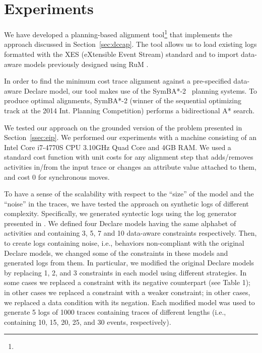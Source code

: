 \section{Experiments}
\label{sec:experiments}



We have developed a planning-based alignment tool\footnote{} that implements the approach discussed in Section~\ref{sec:dccap}.
%
The tool allows us to load existing logs formatted with the XES (eXtensible Event Stream) standard and to import data-aware models previously designed using RuM \cite{}.
%
%

In order to find the minimum cost trace alignment against a pre-specified data-aware Declare model, our tool makes use of the SymBA*-2~\cite{torralba2014symba} planning systems. To produce optimal alignments, SymBA*-2 (winner of the sequential optimizing track at the 2014 Int. Planning Competition) performs a bidirectional A* search.


We tested our approach on the grounded version of the problem presented in Section~\ref{ssec:eip}. We performed our experiments with a machine consisting of an Intel Core i7-4770S CPU 3.10GHz Quad Core and 4GB RAM. We used a standard cost function with unit costs for any alignment step that adds/removes activities in/from the input trace or changes an attribute value attached to them, and cost 0 for synchronous moves.

%
To have a sense of the scalability with respect to the ``size'' of the model and the ``noise'' in the traces, we have tested the approach on synthetic logs of different complexity.
%
Specifically, we generated syntectic logs using the log generator presented in \cite{}. We defined four Declare models having the same alphabet of activities and containing 3, 5, 7 and 10 data-aware constraints respectively.
%
Then, to create logs containing noise, i.e., behaviors non-compliant with the original Declare models, we changed some of the constraints in these models and generated logs from them. In particular, we modified the original Declare models by replacing 1, 2, and 3 constraints in each model using different strategies. In some cases we replaced a constraint with its negative counterpart (see Table 1); in other cases we replaced a constraint with a weaker constraint; in other cases, we replaced a data condition with its negation. Each modified model was used to generate 5 logs of 1000 traces containing traces of different lengths (i.e., containing 10, 15, 20, 25, and 30 events, respectively).

